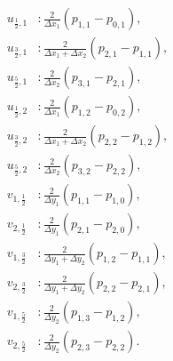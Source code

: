 \documentclass{article}
\numberwithin{equation}{section}
\begin{document}
$$
\begin{aligned}
u_{\frac{1}{2},1} & : \frac{2}{\Delta x_1}\left(p_{1,1}-p_{0,1}\right), \\
u_{\frac{3}{2},1} & : \frac{2}{\Delta x_1+\Delta x_2}\left(p_{2,1}-p_{1,1}\right), \\
u_{\frac{5}{2},1} & : \frac{2}{\Delta x_2}\left(p_{3,1}-p_{2,1}\right), \\
u_{\frac{1}{2},2} & : \frac{2}{\Delta x_1}\left(p_{1,2}-p_{0,2}\right), \\
u_{\frac{3}{2},2} & : \frac{2}{\Delta x_1+\Delta x_2}\left(p_{2,2}-p_{1,2}\right), \\
u_{\frac{5}{2},2} & : \frac{2}{\Delta x_2}\left(p_{3,2}-p_{2,2}\right), \\
v_{1,\frac{1}{2}} & : \frac{2}{\Delta y_1}\left(p_{1,1} - p_{1,0}\right),\\
v_{2,\frac{1}{2}} & : \frac{2}{\Delta y_1}\left(p_{2,1} - p_{2,0}\right),\\
v_{1,\frac{3}{2}} & : \frac{2}{\Delta y_1+\Delta y_2}\left(p_{1,2}-p_{1,1}\right), \\
v_{2,\frac{3}{2}} & : \frac{2}{\Delta y_1+\Delta y_2}\left(p_{2,2}-p_{2,1}\right), \\
v_{1,\frac{5}{2}} & : \frac{2}{\Delta y_2}\left(p_{1,3} - p_{1,2}\right),\\
v_{2,\frac{5}{2}} & : \frac{2}{\Delta y_2}\left(p_{2,3} - p_{2,2}\right).
\end{aligned}
$$
\end{document}

